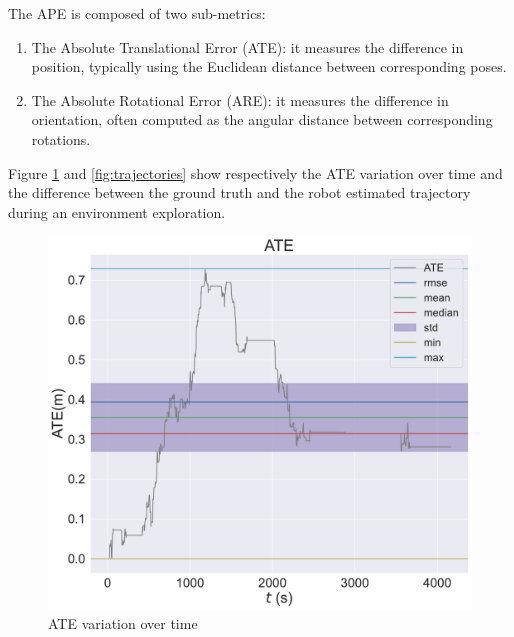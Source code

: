 \documentclass[a4paper]{article}
\begin{document}
The APE is composed of two sub-metrics:
\begin{enumerate}
    \item The Absolute Translational Error (ATE): it measures the difference in position, typically using the 
    Euclidean distance between corresponding poses.
    \item The Absolute Rotational Error (ARE): it measures the difference in orientation, often computed as the 
    angular distance between corresponding rotations.
\end{enumerate}
Figure \ref{fig:APE} and \ref{fig:trajectories} show respectively the ATE variation over time and the difference
between the ground truth and the robot estimated trajectory during an environment exploration.

\begin{figure}[htbp]
    \centering
    \begin{minipage}{0.48\textwidth}
        \centering
        \includegraphics[width=\linewidth]{figures/APE.pdf}
        \caption{ATE variation over time}
        \label{fig:APE}
    \end{minipage}\hfill
    \begin{minipage}{0.48\textwidth}
        \centering

\end{minipage}
\end{figure}
\end{document}
